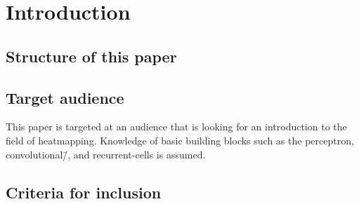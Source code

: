 \section{Introduction}
\blindtext[3]

\subsection{Structure of this paper}
\blindtext[3]

\subsection{Target audience}
This paper is targeted at an audience that is looking for an introduction to 
the field of heatmapping. Knowledge of basic building blocks such as the 
perceptron, convolutional\=/, and recurrent-cells is assumed.

\subsection{Criteria for inclusion}
\blindtext[3]